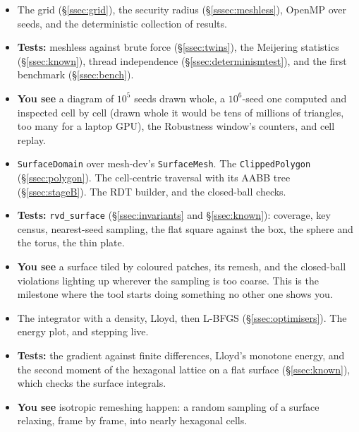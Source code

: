 \documentclass[11pt,a4paper]{article}
\newcommand{\code}[1]{\texttt{#1}}          %
\newcommand{\secref}[1]{\S\ref{#1}}
\begin{document}
\begin{itemize}
\item The grid (\secref{ssec:grid}), the security radius (\secref{sssec:meshless}), OpenMP over
  seeds, and the deterministic collection of results.
\item \textbf{Tests:} meshless against brute force (\secref{ssec:twins}), the Meijering
  statistics (\secref{ssec:known}), thread independence (\secref{ssec:determinismtest}), and the
  first benchmark (\secref{ssec:bench}).
\item \textbf{You see} a diagram of $10^5$ seeds drawn whole, a $10^6$-seed one computed and
  inspected cell by cell (drawn whole it would be tens of millions of triangles, too many for a
  laptop GPU), the Robustness window's counters, and cell replay.
\end{itemize}

\begin{itemize}
\item \code{SurfaceDomain} over mesh-dev's \code{SurfaceMesh}. The \code{ClippedPolygon}
  (\secref{ssec:polygon}). The cell-centric traversal with its AABB tree (\secref{ssec:stageB}).
  The RDT builder, and the closed-ball checks.
\item \textbf{Tests:} \code{rvd\_surface} (\secref{ssec:invariants} and \secref{ssec:known}):
  coverage, key census, nearest-seed sampling, the flat square against the box, the sphere and
  the torus, the thin plate.
\item \textbf{You see} a surface tiled by coloured patches, its remesh, and the closed-ball
  violations lighting up wherever the sampling is too coarse. This is the milestone where the
  tool starts doing something no other one shows you.
\end{itemize}

\begin{itemize}
\item The integrator with a density, Lloyd, then L-BFGS (\secref{ssec:optimisers}). The energy
  plot, and stepping live.
\item \textbf{Tests:} the gradient against finite differences, Lloyd's monotone energy, and the
  second moment of the hexagonal lattice on a flat surface (\secref{ssec:known}), which checks the
  surface integrals.
\item \textbf{You see} isotropic remeshing happen: a random sampling of a surface relaxing, frame
  by frame, into nearly hexagonal cells.
\end{itemize}
\end{document}

